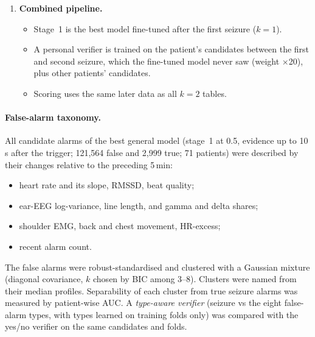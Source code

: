\begin{enumerate}
\begin{itemize}
\item movement per window is the larger of the two accelerometer log-SDs;
\item its causal median is taken over the last ten completed one-minute blocks;
\item alarms are enabled only while this level is at or below the user's own $q$-th percentile ($q\in\{20,35,50\}$), learned on the tuning period.
\end{itemize}
Targets were seizures starting in the alarm window, and false alarms were normalised per 24\,h of alarm-on time. The mode was checked against the dataset's asleep/awake seizure labels.
\item \textbf{Combined pipeline.}
\begin{itemize}
\item Stage~1 is the best model fine-tuned after the first seizure ($k=1$).
\item A personal verifier is trained on the patient's candidates between the first and second seizure, which the fine-tuned model never saw (weight $\times$20), plus other patients' candidates.
\item Scoring uses the same later data as all $k=2$ tables.
\end{itemize}
\end{enumerate}

\paragraph{False-alarm taxonomy.} All candidate alarms of the best general model (stage~1 at 0.5, evidence up to 10\,s after the trigger; 121,564 false and 2,999 true; 71 patients) were described by their changes relative to the preceding 5\,min:
\begin{itemize}
\item heart rate and its slope, RMSSD, beat quality;
\item ear-EEG log-variance, line length, and gamma and delta shares;
\item shoulder EMG, back and chest movement, HR-excess;
\item recent alarm count.
\end{itemize}
The false alarms were robust-standardised and clustered with a Gaussian mixture (diagonal covariance, $k$ chosen by BIC among 3--8). Clusters were named from their median profiles. Separability of each cluster from true seizure alarms was measured by patient-wise AUC. A \emph{type-aware verifier} (seizure vs the eight false-alarm types, with types learned on training folds only) was compared with the yes/no verifier on the same candidates and folds.

